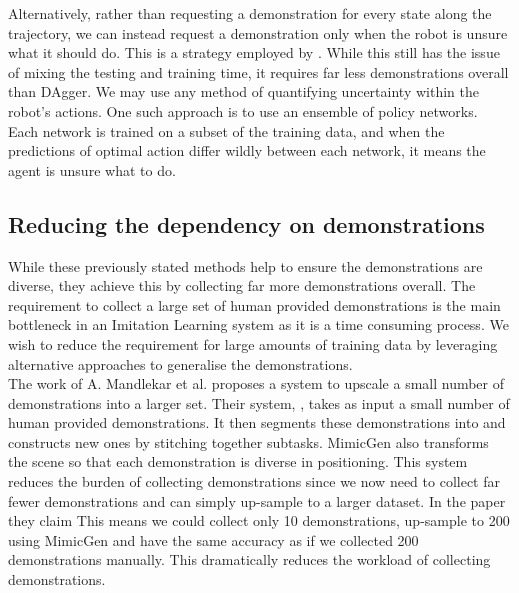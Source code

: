 Alternatively, rather than requesting a demonstration for every state along the trajectory, we can instead request a demonstration only when the robot is unsure what it should do. This is a strategy employed by  \cite{uncertainty-il}. While this still has the issue of mixing the testing and training time, it requires far less demonstrations overall than DAgger. We may use any method of quantifying uncertainty within the robot's actions. One such approach is to use an ensemble of policy networks. Each network is trained on a subset of the training data, and when the predictions of optimal action differ wildly between each network, it means the agent is unsure what to do.

\subsection{Reducing the dependency on demonstrations}
\label{subsec:one-shot}
While these previously stated methods help to ensure the demonstrations are diverse, they achieve this by collecting far more demonstrations overall. The requirement to collect a large set of human provided demonstrations is the main bottleneck in an Imitation Learning system as it is a time consuming process. We wish to reduce the requirement for large amounts of training data by leveraging alternative approaches to generalise the demonstrations.\\

The work of A. Mandlekar et al. \cite{mimicgen} proposes a system to upscale a small number of demonstrations into a larger set. Their system, , takes as input a small number of human provided demonstrations. It then segments these demonstrations into  and constructs new ones by stitching together subtasks. MimicGen also transforms the scene so that each demonstration is diverse in positioning. This system reduces the burden of collecting demonstrations since we now need to collect far fewer demonstrations and can simply up-sample to a larger dataset. In the paper they claim  This means we could collect only 10 demonstrations, up-sample to 200 using MimicGen and have the same accuracy as if we collected 200 demonstrations manually. This dramatically reduces the workload of collecting demonstrations.\\

